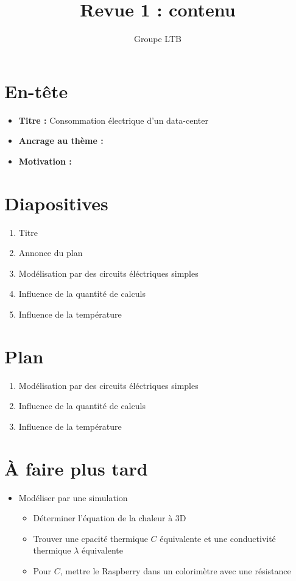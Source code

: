 \documentclass[french]{article}
\title{Revue 1 : contenu}
\author{Groupe LTB}
\begin{document}
\maketitle

\section{En-tête}

\begin{itemize}
    \item \textbf{Titre :} Consommation électrique d'un data-center
    \item \textbf{Ancrage au thème :}
    \item \textbf{Motivation :}
\end{itemize}

\section{Diapositives}

\begin{enumerate}
    \item Titre
    \item Annonce du plan
    \item Modélisation par des circuits éléctriques simples
    \item Influence de la quantité de calculs
    \item Influence de la température
\end{enumerate}

\section{Plan}

\begin{enumerate}
    \item Modélisation par des circuits éléctriques simples
    \item Influence de la quantité de calculs
    \item Influence de la température
\end{enumerate}

\section{À faire plus tard}

\begin{itemize}
    \item Modéliser par une simulation
    \begin{itemize}
        \item Déterminer l'équation de la chaleur à 3D
        \item Trouver une cpacité thermique $C$ équivalente et une conductivité thermique $\lambda$ équivalente
        \item Pour $C$, mettre le Raspberry dans un colorimètre avec une résistance

    \end{itemize}
\end{itemize}
\end{document}
